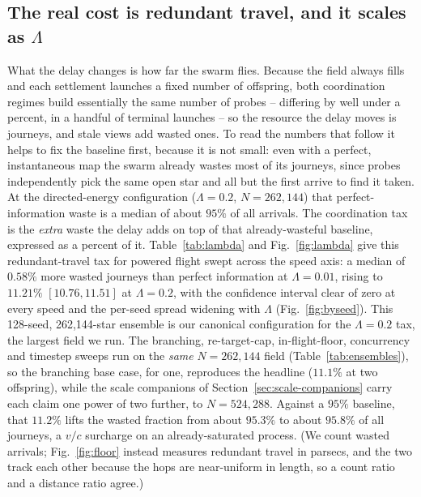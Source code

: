 \subsection{The real cost is redundant travel, and it scales as $\Lambda$}
What the delay changes is how far the swarm flies. Because the field always fills and each
settlement launches a fixed number of offspring, both coordination regimes build essentially the
same number of probes -- differing by well under a percent, in a handful of terminal launches --
so the resource the delay moves is journeys, and stale views add wasted ones. To read the numbers
that follow it helps to fix the baseline first, because it is not small: even with a perfect,
instantaneous map the swarm already wastes most of its journeys, since probes independently pick the
same open star and all but the first arrive to find it taken. At the directed-energy configuration
($\Lambda = 0.2$, $N = 262{,}144$) that perfect-information waste is a median of about $95\%$ of all
arrivals. The coordination tax is the \emph{extra} waste the delay adds on top of that
already-wasteful baseline, expressed as a percent of it. Table~\ref{tab:lambda} and
Fig.~\ref{fig:lambda} give this redundant-travel tax for powered flight swept across the speed axis:
a median of $0.58\%$ more wasted journeys than perfect information at $\Lambda = 0.01$, rising to
$11.21\%$ $[10.76, 11.51]$ at $\Lambda = 0.2$, with the confidence interval clear of zero at every speed
and the per-seed spread widening with $\Lambda$ (Fig.~\ref{fig:byseed}). This 128-seed, 262{,}144-star
ensemble is our canonical configuration for the $\Lambda = 0.2$ tax, the largest field we run. The
branching, re-target-cap, in-flight-floor, concurrency and timestep sweeps run on the \emph{same}
$N = 262{,}144$ field (Table~\ref{tab:ensembles}), so the branching base case, for one, reproduces the
headline ($11.1\%$ at two offspring), while the scale companions of Section~\ref{sec:scale-companions}
carry each claim one power of two further, to $N = 524{,}288$. Against a $95\%$ baseline, that $11.2\%$ lifts the wasted fraction from about $95.3\%$ to
about $95.8\%$ of all journeys, a $v/c$ surcharge on an already-saturated process. (We count wasted arrivals; Fig.~\ref{fig:floor}
instead measures redundant travel in parsecs, and the two track each other because the hops are
near-uniform in length, so a count ratio and a distance ratio agree.)

